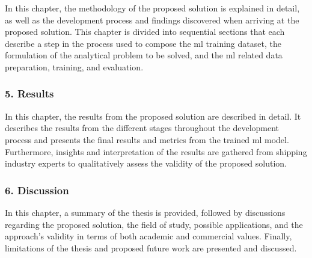 In this chapter, the methodology of the proposed solution is explained in detail, as well as the development process and findings discovered when arriving at the proposed solution. This chapter is divided into sequential sections that each describe a step in the process used to compose the \acrshort{ml} training dataset, the formulation of the analytical problem to be solved, and the \acrfull{ml} related data preparation, training, and evaluation.

\subsubsection{5. Results}

In this chapter, the results from the proposed solution are described in detail. It describes the results from the different stages throughout the development process and presents the final results and metrics from the trained \acrfull{ml} model. Furthermore, insights and interpretation of the results are gathered from shipping industry experts to qualitatively assess the validity of the proposed solution.

\subsubsection{6. Discussion}

In this chapter, a summary of the thesis is provided, followed by discussions regarding the proposed solution, the field of study, possible applications, and the approach's validity in terms of both academic and commercial values. Finally, limitations of the thesis and proposed future work are presented and discussed.
